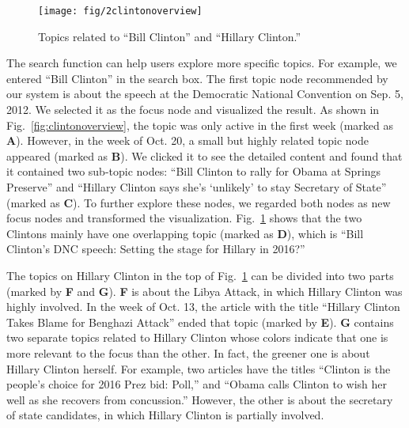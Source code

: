 \begin{figure}[t]
  \centering
  \texttt{[image: fig/2clintonoverview]}
    \vspace{-3mm}
  \caption{Topics related to ``Bill Clinton'' and ``Hillary Clinton.''}
  \vspace{-3mm}
  \label{fig:2clintonoverview}
\end{figure}




The search function can help users explore more specific topics.
For example, we entered ``Bill Clinton'' in the search box.
The first topic node recommended by our system is about the speech at the Democratic National Convention on Sep. 5, 2012.
We selected it as the focus node and visualized the result.
As shown in Fig.~\ref{fig:clintonoverview}, the topic was only active in the first week (marked as \textbf{A}).
However, in the week of Oct. 20, a small but highly related topic node appeared (marked as \textbf{B}).
We clicked it to see the detailed content and found that it contained two sub-topic nodes: ``Bill Clinton to rally for Obama at Springs Preserve'' and ``Hillary Clinton says she's `unlikely' to stay Secretary of State'' (marked as \textbf{C}).
To further explore these nodes, we regarded both nodes as new focus nodes and transformed the visualization.
Fig.~\ref{fig:2clintonoverview} shows that the two Clintons mainly have one overlapping topic (marked as \textbf{D}), which is ``Bill Clinton's DNC speech: Setting the stage for Hillary in 2016?''


The topics on Hillary Clinton in the top of Fig.~\ref{fig:2clintonoverview} can be  divided into two parts (marked by \textbf{F} and \textbf{G}).
\textbf{F} is about the Libya Attack, in which Hillary Clinton was highly involved.
In the week of Oct. 13, the article with the title ``Hillary Clinton Takes Blame for Benghazi Attack'' ended that topic (marked by \textbf{E}).
\textbf{G} contains two separate topics related to Hillary Clinton whose colors indicate that one is more relevant to the focus than the other.
In fact, the greener one is about Hillary Clinton herself.
For example, two articles have the titles ``Clinton is the people's choice for 2016 Prez bid: Poll,'' and ``Obama calls Clinton to wish her well as she recovers from concussion.''
However, the other is about the secretary of state candidates, in which Hillary Clinton is partially involved.



